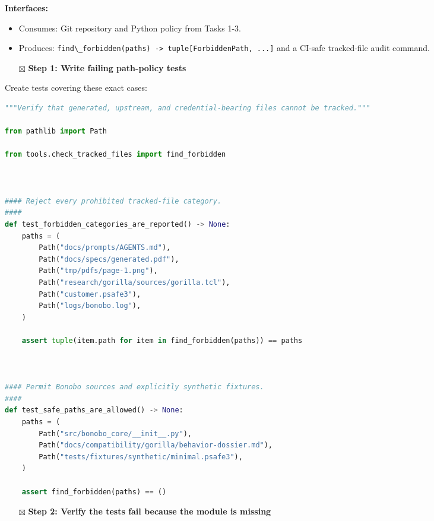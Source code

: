 \documentclass[
  letterpaper,
]{article}
\newcommand{\passthrough}[1]{#1}
\providecommand{\tightlist}{%
  \setlength{\itemsep}{0pt}\setlength{\parskip}{0pt}}
\begin{document}
\textbf{Interfaces:}

\begin{itemize}
\tightlist
\item
  Consumes: Git repository and Python policy from Tasks 1-3.
\item
  Produces: \passthrough{\lstinline!find\_forbidden(paths) -> tuple[ForbiddenPath, ...]!} and a CI-safe tracked-file
  audit command.
\end{itemize}

\begin{itemize}
\tightlist
\item[$\boxtimes$]
  \textbf{Step 1: Write failing path-policy tests}
\end{itemize}

Create tests covering these exact cases:

\begin{lstlisting}[language=Python]
"""Verify that generated, upstream, and credential-bearing files cannot be tracked."""

from pathlib import Path

from tools.check_tracked_files import find_forbidden



#### Reject every prohibited tracked-file category.
####
def test_forbidden_categories_are_reported() -> None:
    paths = (
        Path("docs/prompts/AGENTS.md"),
        Path("docs/specs/generated.pdf"),
        Path("tmp/pdfs/page-1.png"),
        Path("research/gorilla/sources/gorilla.tcl"),
        Path("customer.psafe3"),
        Path("logs/bonobo.log"),
    )

    assert tuple(item.path for item in find_forbidden(paths)) == paths



#### Permit Bonobo sources and explicitly synthetic fixtures.
####
def test_safe_paths_are_allowed() -> None:
    paths = (
        Path("src/bonobo_core/__init__.py"),
        Path("docs/compatibility/gorilla/behavior-dossier.md"),
        Path("tests/fixtures/synthetic/minimal.psafe3"),
    )

    assert find_forbidden(paths) == ()
\end{lstlisting}

\begin{itemize}
\tightlist
\item[$\boxtimes$]
  \textbf{Step 2: Verify the tests fail because the module is missing}
\end{itemize}
\end{document}
